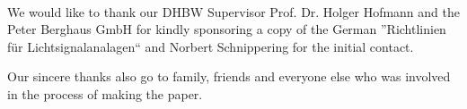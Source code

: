 \vspace{3cm}
\begingroup
{}\\
\endgroup
\vspace{1.5cm}

We would like to thank our DHBW Supervisor Prof. Dr. Holger Hofmann and the Peter Berghaus GmbH for kindly sponsoring a copy of the German ''Richtlinien für Lichtsignalanalagen`` and Norbert Schnippering for the initial contact.

Our sincere thanks also go to family, friends and everyone else who was involved in the process of making the paper.